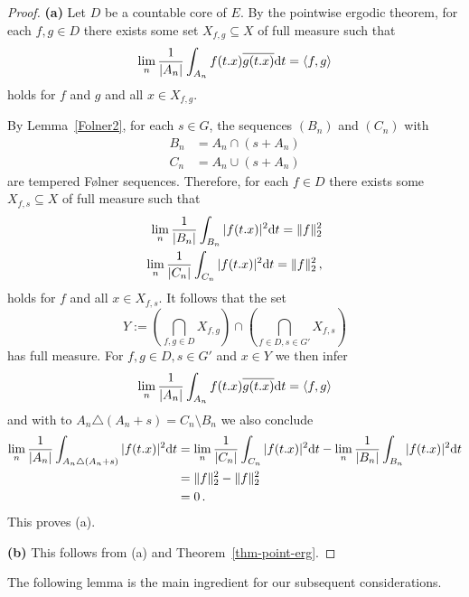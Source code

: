 \documentclass [14pt]{amsart}
\numberwithin{equation}{section}
\newcommand{\dd}{\mbox{\rm d}}
\begin{document}
\begin{proof}
\textbf{(a)}
 Let $D$ be a countable core of $E$. By the pointwise ergodic theorem, for each $f,g \in D$ there exists some set
$X_{f,g} \subseteq X$ of full measure such that
$$\lim_n \frac{1}{|A_n|} \int_{A_n} f(t.x) \overline{g(t.x)} \dd t = \langle f, g\rangle$$
holds for $f$ and $g$  and all $x \in X_{f,g}$.

By Lemma~\ref{Folner2}, for each $s \in G$, the sequences $(B_n)$ and $(C_n)$ with
\begin{align*}
  B_n & =A_n \cap (s+A_n)\\
  C_n & =A_n \cup (s+A_n)
 \end{align*}
 are tempered F\o lner sequences. Therefore, for each $f \in D$ there exists some $X_{f,s} \subseteq X$ of full measure such that
\begin{align*}
\lim_n \frac{1}{|B_n|} \int_{B_n} |f(t.x)|^2  \dd t = \| f \|_2^2  \\
\lim_n \frac{1}{|C_n|} \int_{C_n} |f(t.x)|^2  \dd t = \| f \|_2^2 \,,
\end{align*}
holds for $f$  and all $x \in X_{f,s}$.
It follows that the set
\[
Y:= \left( \bigcap_{f,g \in D} X_{f,g} \right) \cap \left( \bigcap_{f \in D, s \in G' } X_{f,s} \right)
\]
has full measure. For  $f,g \in D, s \in G'$ and $x \in Y$ we then infer
 $$
\lim_n \frac{1}{|A_n|} \int_{A_n} f(t.x) \overline{g(t.x)} \dd t = \langle f, g\rangle$$
and   with  to $A_n\triangle (A_n + s) = C_n \setminus B_n$  we also conclude
\begin{align*}
\lim_n \frac{1}{|A_n|} \int_{A_n \triangle (A_n+s)} |f(t.x)|^2 \dd t &= \lim_n \frac{1}{|C_n|} \int_{C_n} |f(t.x)|^2 \dd t -\lim_n \frac{1}{|B_n|} \int_{B_n} |f(t.x)|^2 \dd t \\
&=  \| f \|_2^2 - \| f \|_2^2\\
&=0 \,.
\end{align*}
This proves (a).

\smallskip

\textbf{(b)}  This follows from (a) and Theorem~\ref{thm-point-erg}.
\end{proof}



The following lemma  is the main ingredient for our subsequent considerations.
\end{document}
